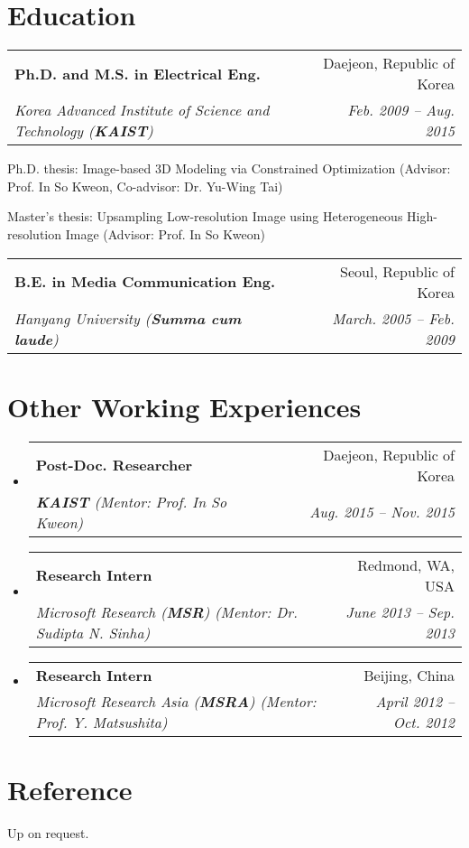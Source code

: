 \documentclass[letterpaper,11pt]{article}
\makeatletter
\newcommand{\resumeItem}[1]{
  \small{
  \item{#1 \vspace{-2pt}}
  }
}
\newcommand{\resumeSubheading}[4]{
  \vspace{-2pt}\item
    \begin{tabular*}{0.97\textwidth}[t]{l@{\extracolsep{\fill}}r}
      \textbf{#1} & #2 \\
      \textit{\small#3} & \textit{\small #4} \\
    \end{tabular*}\vspace{-7pt}
}
\newcommand{\resumeSubHeadingListStart}{\begin{itemize}[leftmargin=0.15in, label={}]}
\newcommand{\resumeSubHeadingListEnd}{\end{itemize}}
\newcommand{\resumeItemListStart}{\begin{itemize}}
\newcommand{\resumeItemListEnd}{\end{itemize}\vspace{-5pt}}
\makeatother
\begin{document}
\section{Education}
  \resumeSubHeadingListStart
    \resumeSubheading
      {Ph.D. and M.S. in Electrical Eng.}{Daejeon, Republic of Korea}
      {Korea Advanced Institute of Science and Technology \textnormal{(\textbf{KAIST})}}{Feb. 2009 -- Aug. 2015}
        \resumeItemListStart
        \resumeItem{Ph.D. thesis: Image-based 3D Modeling via Constrained Optimization (Advisor: Prof. In So Kweon, Co-advisor: Dr. Yu-Wing Tai)}
        \resumeItem{Master's thesis: Upsampling Low-resolution Image using Heterogeneous High-resolution Image (Advisor: Prof. In So Kweon)}
        \resumeItemListEnd
    \resumeSubheading
      {B.E. in Media Communication Eng.}{Seoul, Republic of Korea}
      {Hanyang University (\textbf{Summa cum laude})}{March. 2005 -- Feb. 2009}
  \resumeSubHeadingListEnd








\section{Other Working Experiences}
  \resumeSubHeadingListStart    
    \resumeSubheading
      {Post-Doc. Researcher}{Daejeon, Republic of Korea}
      {\textnormal{\textbf{KAIST}} (Mentor: Prof. In So Kweon)}{Aug. 2015 -- Nov. 2015}
    \resumeSubheading
      {Research Intern}{Redmond, WA, USA}
      {Microsoft Research \textnormal{(\textbf{MSR})} (Mentor: Dr. Sudipta N. Sinha)}{June 2013 -- Sep. 2013}
    \resumeSubheading
      {Research Intern}{Beijing, China}
      {Microsoft Research Asia \textnormal{(\textbf{MSRA})} (Mentor: Prof. Y. Matsushita)}{April 2012 -- Oct. 2012}     
  \resumeSubHeadingListEnd

\section{Reference}
  \resumeItemListStart
  \resumeItem{Up on request.}
  \resumeItemListEnd
  
\end{document}
